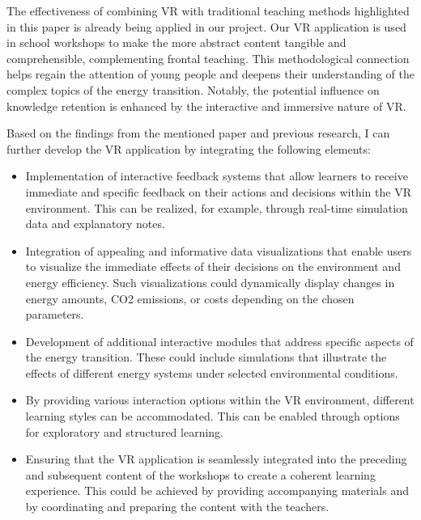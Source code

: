 \documentclass[draft, final]{vutinfth} %
\begin{document}
The effectiveness of combining VR with traditional teaching methods highlighted in this paper is already being applied in our project. Our VR application is used in school workshops to make the more abstract content tangible and comprehensible, complementing frontal teaching. This methodological connection helps regain the attention of young people and deepens their understanding of the complex topics of the energy transition. Notably, the potential influence on knowledge retention is enhanced by the interactive and immersive nature of VR.

Based on the findings from the mentioned paper and previous research, I can further develop the VR application by integrating the following elements:

\begin{itemize}
  \item Implementation of interactive feedback systems that allow learners to receive immediate and specific feedback on their actions and decisions within the VR environment. This can be realized, for example, through real-time simulation data and explanatory notes.

  \item Integration of appealing and informative data visualizations that enable users to visualize the immediate effects of their decisions on the environment and energy efficiency. Such visualizations could dynamically display changes in energy amounts, CO2 emissions, or costs depending on the chosen parameters.

  \item Development of additional interactive modules that address specific aspects of the energy transition. These could include simulations that illustrate the effects of different energy systems under selected environmental conditions.

  \item By providing various interaction options within the VR environment, different learning styles can be accommodated. This can be enabled through options for exploratory and structured learning.

  \item Ensuring that the VR application is seamlessly integrated into the preceding and subsequent content of the workshops to create a coherent learning experience. This could be achieved by providing accompanying materials and by coordinating and preparing the content with the teachers.

\end{itemize}
\end{document}
